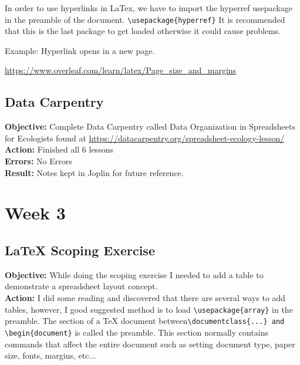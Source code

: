 \documentclass[a4paper,11pt]{article}
\begin{document}
\normalsize 

In order to use hyperlinks in LaTex, we have to import the hyperref usepackage in the preamble of the document. \verb|\usepackage{hyperref}| It is recommended that this is the last package to get loaded otherwise it could cause problems.

Example: Hyperlink opens in a new page.

\url{https://www.overleaf.com/learn/latex/Page_size_and_margins}

\subsection{Data Carpentry}

\noindent \textbf{Objective:} Complete Data Carpentry called Data Organization in Spreadsheets for Ecologists found at \url{https://datacarpentry.org/spreadsheet-ecology-lesson/}\\

\noindent \textbf{Action:} Finished all 6 lessons\\

\noindent \textbf{Errors:} No Errors\\

\noindent \textbf{Result:} Notes kept in Joplin for future reference. \\

\newpage

\section{Week 3}

\subsection{LaTeX Scoping Exercise}

\noindent \textbf{Objective:} While doing the scoping exercise I needed to add a table to demonstrate a spreadsheet layout concept.\\

\noindent \textbf{Action:} I did some reading and discovered that there are several ways to add tables, however, I good suggested method is to load \verb|\usepackage{array}| in the preamble. The section of a TeX document between\verb|\documentclass{...} and \begin{document}| is called the preamble. This section normally contains commands that affect the entire document such as setting document type, paper size, fonts, margins, etc...\\
\end{document}
